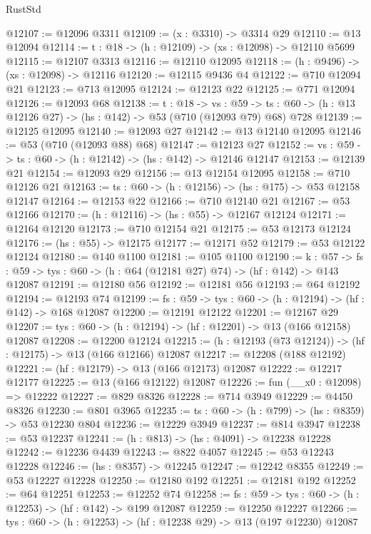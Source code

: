 \begin{lexlean}{RustStd}
\begin{coremodule}
@12107 := @12096 @3311
@12109 := (x : @3310) -> @3314 @29
@12110 := @13 @12094
@12114 := {t : @18} -> (h : @12109) -> (xs : @12098) -> @12110 @5699
@12115 := @12107 @3313
@12116 := @12110 @12095
@12118 := (h : @9496) -> (xs : @12098) -> @12116
@12120 := @12115 @9436 @4
@12122 := @710 @12094 @21
@12123 := @713 @12095
@12124 := @12123 @22
@12125 := @771 @12094
@12126 := @12093 @68
@12138 := {t : @18} ->
  {vs : @59} ->
  {ts : @60} -> (h : @13 @12126 @27) -> (hs : @142) -> @53 (@710 (@12093 @79) @68) @728
@12139 := @12125 @12095
@12140 := @12093 @27
@12142 := @13 @12140 @12095
@12146 := @53 (@710 (@12093 @88) @68)
@12147 := @12123 @27
@12152 := {vs : @59} -> {ts : @60} -> (h : @12142) -> (hs : @142) -> @12146 @12147
@12153 := @12139 @21
@12154 := @12093 @29
@12156 := @13 @12154 @12095
@12158 := @710 @12126 @21
@12163 := {ts : @60} -> (h : @12156) -> (hs : @175) -> @53 @12158 @12147
@12164 := @12153 @22
@12166 := @710 @12140 @21
@12167 := @53 @12166
@12170 := (h : @12116) -> (hs : @55) -> @12167 @12124
@12171 := @12164 @12120
@12173 := @710 @12154 @21
@12175 := @53 @12173 @12124
@12176 := (hs : @55) -> @12175
@12177 := @12171 @52
@12179 := @53 @12122 @12124
@12180 := @140 @1100
@12181 := @105 @1100
@12190 := {k : @57} ->
  {fs : @59} -> {tys : @60} -> (h : @64 (@12181 @27) @74) -> (hf : @142) -> @143 @12087
@12191 := @12180 @56
@12192 := @12181 @56
@12193 := @64 @12192
@12194 := @12193 @74
@12199 := {fs : @59} -> {tys : @60} -> (h : @12194) -> (hf : @142) -> @168 @12087
@12200 := @12191 @12122
@12201 := @12167 @29
@12207 := {tys : @60} -> (h : @12194) -> (hf : @12201) -> @13 (@166 @12158) @12087
@12208 := @12200 @12124
@12215 := (h : @12193 (@73 @12124)) -> (hf : @12175) -> @13 (@166 @12166) @12087
@12217 := @12208 (@188 @12192)
@12221 := (hf : @12179) -> @13 (@166 @12173) @12087
@12222 := @12217 @12177
@12225 := @13 (@166 @12122) @12087
@12226 := fun (__x0 : @12098) => @12222
@12227 := @829 @8326
@12228 := @714 @3949
@12229 := @4450 @8326
@12230 := @801 @3965
@12235 := {ts : @60} -> (h : @799) -> (hs : @8359) -> @53 @12230 @804
@12236 := @12229 @3949
@12237 := @814 @3947
@12238 := @53 @12237
@12241 := (h : @813) -> (hs : @4091) -> @12238 @12228
@12242 := @12236 @4439
@12243 := @822 @4057
@12245 := @53 @12243 @12228
@12246 := (hs : @8357) -> @12245
@12247 := @12242 @8355
@12249 := @53 @12227 @12228
@12250 := @12180 @192
@12251 := @12181 @192
@12252 := @64 @12251
@12253 := @12252 @74
@12258 := {fs : @59} -> {tys : @60} -> (h : @12253) -> (hf : @142) -> @199 @12087
@12259 := @12250 @12227
@12266 := {tys : @60} -> (h : @12253) -> (hf : @12238 @29) -> @13 (@197 @12230) @12087

\end{coremodule}
\end{lexlean}
